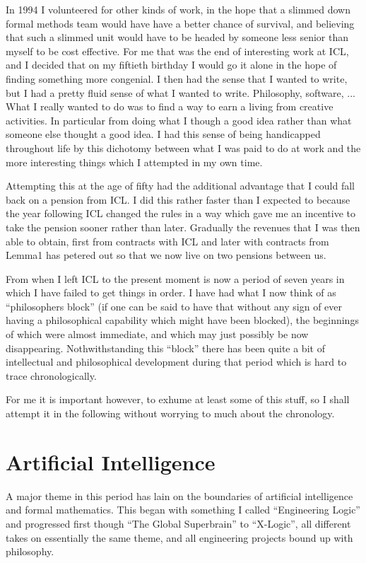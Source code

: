 \documentclass[10pt,titlepage]{book}
\begin{document}
In 1994 I volunteered for other kinds of work, in the hope that a slimmed down formal methods team would have have a better chance of survival, and believing that such a slimmed unit would have to be headed by someone less senior than myself to be cost effective.
For me that was the end of interesting work at ICL, and I decided that on my fiftieth birthday I would go it alone in the hope of finding something more congenial.
I then had the sense that I wanted to write, but I had a pretty fluid sense of what I wanted to write.
Philosophy, software, ...
What I really wanted to do was to find a way to earn a living from creative activities.
In particular from doing what I though a good idea rather than what someone else thought a good idea.
I had this sense of being handicapped throughout life by this dichotomy between what I was paid to do at work and the more interesting things which I attempted in my own time.

Attempting this at the age of fifty had the additional advantage that I could fall back on a pension from ICL.
I did this rather faster than I expected to because the year following ICL changed the rules in a way which gave me an incentive to take the pension sooner rather than later.
Gradually the revenues that I was then able to obtain, first from contracts with ICL and later with contracts from Lemma1 has petered out so that we now live on two pensions between us.

From when I left ICL to the present moment is now a period of seven years in which I have failed to get things in order.
I have had what I now think of as ``philosophers block'' (if one can be said to have that without any sign of ever having a philosophical capability which might have been blocked), the beginnings of which were almost immediate, and which may just possibly be now disappearing.
Nothwithstanding this ``block'' there has been quite a bit of intellectual and philosophical development during that period which is hard to trace chronologically.

For me it is important however, to exhume at least some of this stuff, so I shall attempt it in the following without worrying to much about the chronology.

\section{Artificial Intelligence}

A major theme in this period has lain on the boundaries of artificial intelligence and formal mathematics.
This began with something I called ``Engineering Logic'' and progressed first though ``The Global Superbrain'' to ``X-Logic'', all different takes on essentially the same theme, and all engineering projects bound up with philosophy.
\end{document}
